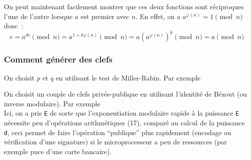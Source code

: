 \documentclass[a4paper,11pt]{book}
\begin{document}
\begin{giacjshere}
On peut maintenant facilement montrer que ces deux fonctions
sont r\'eciproques l'une de l'autre lorsque $a$ est premier avec $n$.
En effet, on a $a^{\varphi(n)}=1 \pmod n$ donc~:
$$ c=a^{de} \pmod n = a^{1+k \varphi(n)} \pmod n
=a (a^{\varphi(n)})^k \pmod n = a \pmod n$$

\subsubsection{Comment g\'en\'erer des clefs}
On choisit $p$ et $q$ en utilisant le test de Miller-Rabin. Par
exemple\\

On choisit un couple de clefs priv\'ee-publique en utilisant
l'identit\'e de B\'ezout (ou inverse modulaire). Par exemple\\
Ici, on a pris \verb|E| de sorte que l'exponentiation
modulaire rapide \`a la puissance \verb|E|
n\'ecessite peu d'op\'erations arithm\'etiques (17),
compar\'e au calcul de la puissance \verb|d|, ceci
permet de faire l'op\'eration ``publique'' plus rapidement
(encodage ou v\'erification d'une signature) si le microprocesseur
a peu de ressources (par exemple puce d'une carte bancaire).\\


\end{giacjshere}
\end{document}
